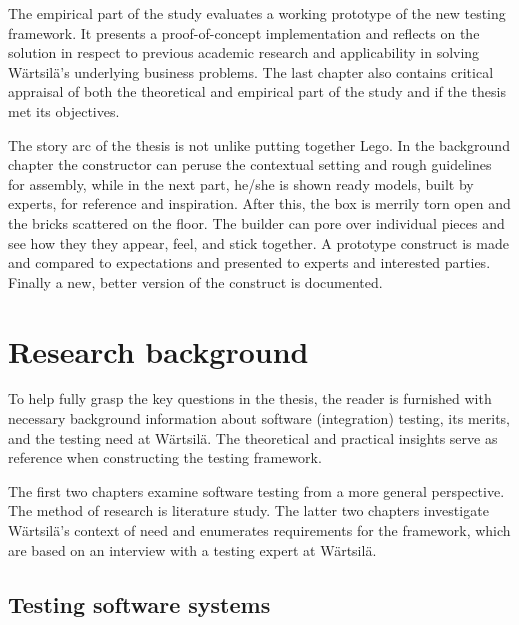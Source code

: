 \documentclass[12pt,a4paper,oneside,pdftex]{report}
\begin{document}
The empirical part of the study evaluates a working prototype of the new testing framework. It presents a proof-of-concept implementation and reflects on the solution in respect to previous academic research and applicability in solving Wärtsilä's underlying business problems. The last chapter also contains critical appraisal of both the theoretical and empirical part of the study and if the thesis met its objectives.

The story arc of the thesis is not unlike putting together Lego. In the background chapter the constructor can peruse the contextual setting and rough guidelines for assembly, while in the next part, he/she is shown ready models, built by experts, for reference and inspiration. After this, the box is merrily torn open and the bricks scattered on the floor. The builder can pore over individual pieces and see how they they appear, feel, and stick together. A prototype construct is made and compared to expectations and presented to experts and interested parties. Finally a new, better version of the construct is documented.

\chapter{Research background}
\label{chapter:background}


To help fully grasp the key questions in the thesis, the reader is furnished with necessary background information about software (integration) testing, its merits, and the testing need at Wärtsilä. The theoretical and practical insights serve as reference when constructing the testing framework. 

The first two chapters examine software testing from a more general perspective. The method of research is literature study. The latter two chapters investigate Wärtsilä's context of need and enumerates requirements for the framework, which are based on an interview with a testing expert at Wärtsilä.

\section{Testing software systems}
\end{document}
